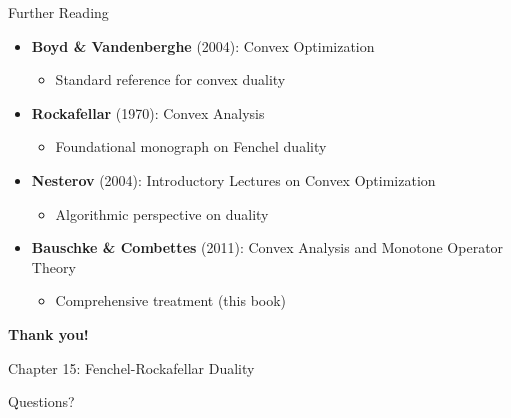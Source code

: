 \documentclass[aspectratio=169,10pt]{beamer}
\begin{document}
\begin{frame}{Further Reading}
  \begin{itemize}
    \item \textbf{Boyd \& Vandenberghe} (2004): Convex Optimization
      \begin{itemize}
        \item Standard reference for convex duality
      \end{itemize}
    
    \item \textbf{Rockafellar} (1970): Convex Analysis
      \begin{itemize}
        \item Foundational monograph on Fenchel duality
      \end{itemize}
    
    \item \textbf{Nesterov} (2004): Introductory Lectures on Convex Optimization
      \begin{itemize}
        \item Algorithmic perspective on duality
      \end{itemize}
    
    \item \textbf{Bauschke \& Combettes} (2011): Convex Analysis and Monotone Operator Theory
      \begin{itemize}
        \item Comprehensive treatment (this book)
      \end{itemize}
  \end{itemize}
\end{frame}

\begin{frame}
  \centering
  \Large

  \textbf{Thank you!}

  \vspace{1cm}

  Chapter 15: Fenchel-Rockafellar Duality

  \vspace{0.5cm}

  \normalsize
  Questions?
\end{frame}
\end{document}

